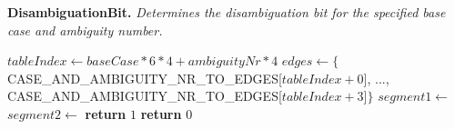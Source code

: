 \begin{algorithm}[H]
\caption{\textbf{DisambiguationBit.} \textit{Determines the disambiguation bit for the specified base case and ambiguity number.}}\label{alg:cms_lt_disambiguation_bit}
\begin{algorithmic}[1]
	\State $tableIndex \gets baseCase * 6 * 4 + ambiguityNr * 4$
	\State $edges \gets \{$CASE\_AND\_AMBIGUITY\_NR\_TO\_EDGES[$tableIndex + 0$],
	\Statex ..., CASE\_AND\_AMBIGUITY\_NR\_TO\_EDGES[$tableIndex + 3$]$\}$
	\State $segment1 \gets $ 
	\State {}
	\State $segment2 \gets $
	\State {}
		\State \textbf{return} $1$
	\Else
		\State \textbf{return} $0$
	\EndIf
\EndProcedure
\end{algorithmic}
\end{algorithm}

